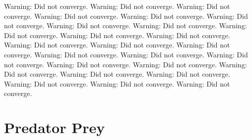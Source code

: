 \documentclass[letterpaper,10pt,english]{jupyterBook}
\begin{document}
\begin{sphinxVerbatim}[commandchars=\\\{\}]
\PYG{p}{[}\PYG{p}{[}\PYG{p}{]}\PYG{p}{]}
\end{sphinxVerbatim}

\begin{sphinxVerbatim}[commandchars=\\\{\}]
Warning: Did not converge.
Warning: Did not converge.
Warning: Did not converge.
Warning: Did not converge.
Warning: Did not converge.
Warning: Did not converge.
Warning: Did not converge.
Warning: Did not converge.
Warning: Did not converge.
Warning: Did not converge.
Warning: Did not converge.
Warning: Did not converge.
Warning: Did not converge.
Warning: Did not converge.
Warning: Did not converge.
Warning: Did not converge.
Warning: Did not converge.
Warning: Did not converge.
Warning: Did not converge.
Warning: Did not converge.
Warning: Did not converge.
Warning: Did not converge.
Warning: Did not converge.
Warning: Did not converge.
Warning: Did not converge.
\end{sphinxVerbatim}

\noindent{}


\part{Predator Prey}
\end{document}
